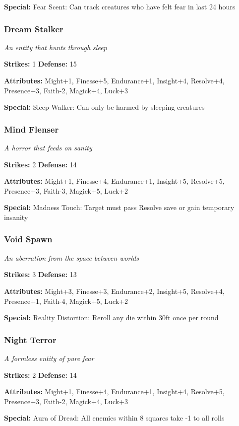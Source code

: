 \documentclass[10pt,twoside]{article}
\begin{document}
\textbf{Special:} Fear Scent: Can track creatures who have felt fear in last 24 hours

\subsubsection{Dream Stalker}
\textit{An entity that hunts through sleep}

\textbf{Strikes:} 1 \quad \textbf{Defense:} 15

\textbf{Attributes:} Might+1, Finesse+5, Endurance+1, Insight+4, Resolve+4, Presence+3, Faith-2, Magick+4, Luck+3

\textbf{Special:} Sleep Walker: Can only be harmed by sleeping creatures

\subsubsection{Mind Flenser}
\textit{A horror that feeds on sanity}

\textbf{Strikes:} 2 \quad \textbf{Defense:} 14

\textbf{Attributes:} Might+1, Finesse+4, Endurance+1, Insight+5, Resolve+5, Presence+3, Faith-3, Magick+5, Luck+2

\textbf{Special:} Madness Touch: Target must pass Resolve save or gain temporary insanity

\subsubsection{Void Spawn}
\textit{An aberration from the space between worlds}

\textbf{Strikes:} 3 \quad \textbf{Defense:} 13

\textbf{Attributes:} Might+3, Finesse+3, Endurance+2, Insight+5, Resolve+4, Presence+1, Faith-4, Magick+5, Luck+2

\textbf{Special:} Reality Distortion: Reroll any die within 30ft once per round

\subsubsection{Night Terror}
\textit{A formless entity of pure fear}

\textbf{Strikes:} 2 \quad \textbf{Defense:} 14

\textbf{Attributes:} Might+1, Finesse+4, Endurance+1, Insight+4, Resolve+5, Presence+3, Faith-2, Magick+4, Luck+3

\textbf{Special:} Aura of Dread: All enemies within 8 squares take -1 to all rolls
\end{document}
